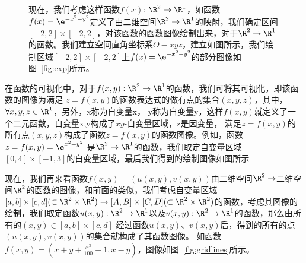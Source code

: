 \documentclass[indent]{watsonbook}
\begin{document}
{\begin{figure}[!h]
\begin{minipage}{0.45\linewidth}
现在，我们考虑这样函数$f(x)$: $\R^2\to \R^1$，如函数$f(x) = \e^{-x^2-y^2}$定义了由二维空间$\R^2\to\R^1$的映射，我们确定区间$[-2,2]\times[-2,2]$，对该函数的函数图像绘制出来，对于$\R^2\to\R^1$的函数。我们建立空间直角坐标系$O-xyz$，建立如图所示，我们绘制区域$[-2,2]\times[-2,2]$上$f(x) = \e^{-x^2-y^2}$的部分图像如图~\ref{fig:exp}所示。
\end{minipage}\qquad
  \begin{minipage}{0.45\linewidth}
\centering

\vspace{12pt}

\end{minipage}
\end{figure}

在函数的可视化中，对于$f(x,y):\R^2\to\R^1$的函数，我们可将其可视化，即该函数的图像为满足
$z=f(x,y)$的函数表达式的做有点的集合$(x,y,z)$，其中，$\forall x,y,z \in \R^1$，另外，x称为自变量x，
y称为自变量y，这样$f(x,y)$就定义了一个二元函数，自变量x,y构成了$xy$-自变量区域，z是因变量，
满足$z=f(x,y)$的所有点$(x,y,z)$构成了函数$z=f(x,y)$的函数图像。例如，函数$z=f(x,y)=\e^{x^2+y^2}$
是$\R^2\to\R^1$的函数，我们取定自变量区域$[0,4] \times [-1,3]$的自变量区域，最后我们得到的绘制图像如图所示

现在，我们再来看函数$f(x,y)=(u(x,y),v(x,y))$由二维空间$\R^2\to$二维空间$\R^2$的函数的图像，和前面的类似，我们考虑自变量区域$[a,b]\times[c,d](\subset \R^2\times\R^2)\to [A,B]\times[C,D](\subset \R^2\times\R^2)$的函数，考虑其图像的绘制，我们取定函数$u(x,y):\R^2\to\R^1$以及$v(x,y):\R^2\to\R^1$的函数，那么由所有的$(x,y)\in [a,b]\times[c,d]$
经过函数$u(x,y)$、$v(x,y)$后，得到的所有的点$(u(x,y),v(x,y))$的集合就构成了其函数图像。
如函数$f(x,y)=(x+y+\frac{x^3}{100}+1,x-y)$，图像如图~\ref{fig:gridlines}所示。


}
\end{document}
